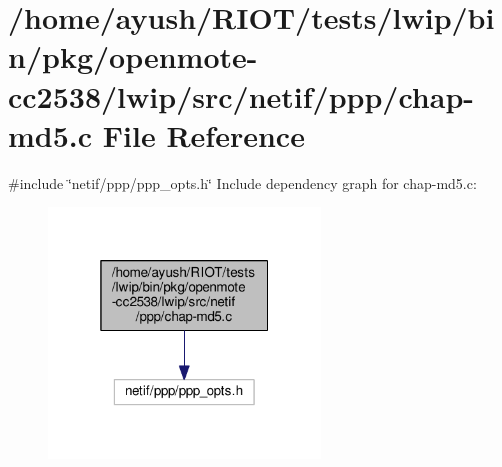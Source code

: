 \hypertarget{openmote-cc2538_2lwip_2src_2netif_2ppp_2chap-md5_8c}{}\section{/home/ayush/\+R\+I\+O\+T/tests/lwip/bin/pkg/openmote-\/cc2538/lwip/src/netif/ppp/chap-\/md5.c File Reference}
\label{openmote-cc2538_2lwip_2src_2netif_2ppp_2chap-md5_8c}
{\ttfamily \#include \char`\"{}netif/ppp/ppp\+\_\+opts.\+h\char`\"{}}\newline
Include dependency graph for chap-\/md5.c\+:
\nopagebreak
\begin{figure}[H]
\begin{center}
\leavevmode
\includegraphics[width=205pt]{openmote-cc2538_2lwip_2src_2netif_2ppp_2chap-md5_8c__incl}
\end{center}
\end{figure}
